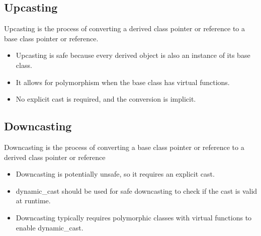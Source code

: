 \documentclass{report}
\begin{document}
    \bigbreak \noindent 
    \subsection{Upcasting}
    \bigbreak \noindent 
    Upcasting is the process of converting a derived class pointer or reference to a base class pointer or reference.
    \begin{itemize}
        \item Upcasting is safe because every derived object is also an instance of its base class.
        \item It allows for polymorphism when the base class has virtual functions.
        \item No explicit cast is required, and the conversion is implicit.
    \end{itemize}

    \bigbreak \noindent 
    \subsection{Downcasting}
    \bigbreak \noindent 
    Downcasting is the process of converting a base class pointer or reference to a derived class pointer or reference
    \begin{itemize}
        \item Downcasting is potentially unsafe, so it requires an explicit cast.
        \item dynamic\_cast should be used for safe downcasting to check if the cast is valid at runtime.
        \item Downcasting typically requires polymorphic classes with virtual functions to enable dynamic\_cast.
    \end{itemize}
\end{document}
